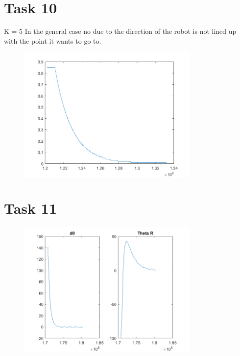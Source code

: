 \documentclass[a4paper,12pt,oneside,onecolumn]{article} %
\begin{document}
\section*{Task 10}
K = 5
In the general case no due to the direction of the robot is not lined up with the point it wants to go to. 
\begin{figure}[H]
\begin{center}	
  \includegraphics[width = 0.8\textwidth]{task10.png}
 \end{center}
\end{figure}

\section*{Task 11}

\begin{figure}[H]
\begin{center}	
  \includegraphics[width = 0.8\textwidth]{task11.png}
 \end{center}
\end{figure}
\end{document}
